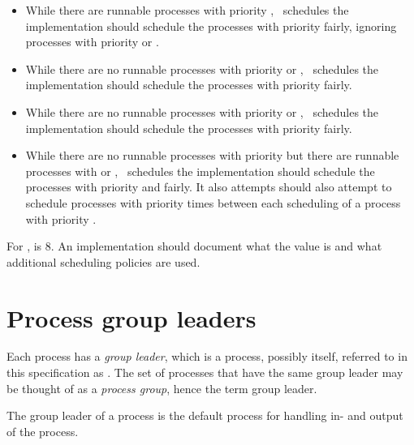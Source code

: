 \begin{itemize}
\item While there are runnable processes with priority ,
\ifOld \OldErlang\ schedules \fi
\ifNew the implementation should schedule \fi
the processes with priority  fairly,
ignoring processes with priority  or .

\item While there are no runnable processes with priority  or ,
\ifOld \OldErlang\ schedules \fi
\ifNew the implementation should schedule \fi
the processes with priority  fairly.

\item While there are no runnable processes with priority  or ,
\ifOld \OldErlang\ schedules \fi
\ifNew the implementation should schedule \fi
the processes with priority  fairly.

\item While there are no runnable processes with priority  but
there are runnable processes with  or ,
\ifOld \OldErlang\ schedules \fi
\ifNew the implementation should schedule \fi
the processes with priority 
and  fairly.  It
\ifOld also attempts \fi
\ifNew should also attempt \fi
to schedule processes with
priority 
times between each scheduling of a process with
priority .
\end{itemize}
\ifOld
For \OldErlang,  is $8$.
\fi
\ifNew
An implementation should document what the value  is and what
additional scheduling policies are used.
\fi
{}

\section{Process group leaders}

\label{section:group-leader}

Each process  has a \emph{group leader}, which is a process, possibly itself,
referred to in this specification as .
The set of processes that have the same group leader may be thought of as a
\emph{process group}, hence the term group leader.

The group leader of a process is the default process for handling
in- and output of the process.


